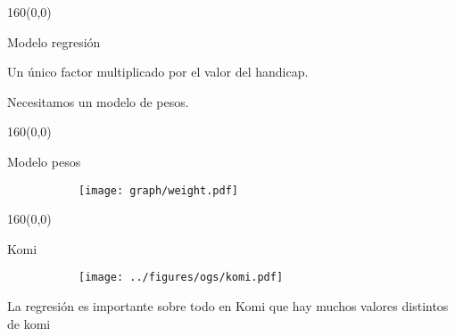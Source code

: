 \documentclass[shownotes,aspectratio=169]{beamer}
\begin{document}
\begin{frame}[plain]
\begin{textblock}{160}(0,0)
\begin{center}
 \Large Modelo regresión
\end{center}
\end{textblock}

Un único factor multiplicado por el valor del handicap. 

Necesitamos un modelo de pesos.

\end{frame}




\begin{frame}[plain]
\begin{textblock}{160}(0,0)
\begin{center}
 \Large Modelo pesos
\end{center}
\end{textblock}

   \begin{figure}[H]     
     \centering
     \begin{subfigure}[b]{0.75\textwidth}
       \texttt{[image: graph/weight.pdf]} 
     \end{subfigure}
   \end{figure} 

\end{frame}


\begin{frame}[plain]
\begin{textblock}{160}(0,0)
\begin{center}
 \Large Komi 
\end{center}
\end{textblock}

  \begin{figure}[H]     
     \centering
     \begin{subfigure}[b]{0.5\textwidth}
       \texttt{[image: ../figures/ogs/komi.pdf]} 
     \end{subfigure}
   \end{figure} 
\pause

La regresión es importante sobre todo en Komi que hay muchos valores distintos de komi

\end{frame}
\end{document}
